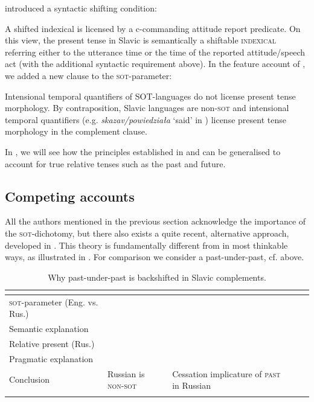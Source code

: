 \documentclass[output=paper,colorlinks,citecolor=brown]{langscibook}
\begin{document}
\citet{babyonyshev-matushansky06} introduced a syntactic shifting condition: 

\eanoraggedright A shifted indexical is licensed by a c-commanding attitude report predicate.\hfill \citep{babyonyshev-matushansky06} 
\z
On this view, the present tense in Slavic is semantically a shiftable \textsc{indexical} 
referring either to the utterance time or the time of the reported 
attitude/speech act (with the additional syntactic requirement above). 
 In the feature account of \citet{gronn_stechow2012}, we added a new clause  to the \textsc{sot}-parameter: 
 
\eanoraggedright Intensional temporal quantifiers of \textsc{SOT}-languages do not
license present tense morphology. \citep{gronn_stechow2012}
\z
By contraposition, Slavic languages are non-\textsc{sot} and intensional temporal quantifiers (e.g. \textit{skazav/powiedziała} `said' in ) {license} present tense morphology in the complement clause.

In , we will see how the principles established in \citet{babyonyshev-matushansky06} and
\citet{gronn_stechow2012} can be generalised to account for true relative tenses such as the past and future. 


\subsection{Competing accounts}
All the authors mentioned in the previous section acknowledge the importance of the \textsc{sot}-dichotomy, but there also exists  a quite recent, alternative approach, developed in \citet{Altshuler16}. This theory is fundamentally different from \citet{gronn_stechow2012} in most thinkable ways, as illustrated in  . For comparison we consider a past-under-past, cf.  above.


\begin{table}
\caption{Why past-under-past is backshifted in Slavic complements.}
\label{tab:altgro}
 \begin{tabularx}{1\textwidth}{lYYYY} %
  \lsptoprule
           & \citet{gronn_stechow2012} & \citet{Altshuler16}  \\
  \midrule
  \textsc{sot}-parameter (Eng. vs. Rus.)  &  &     \\   
  Semantic explanation   &  &      \\
  Relative present (Rus.)  &  &    \\ 
  Pragmatic explanation   &  &   \\
  Conclusion  & Russian is \textsc{non-sot}  & Cessation implicature of \textsc{past} in Russian  \\
  \lspbottomrule
 \end{tabularx}
\end{table}
\end{document}
